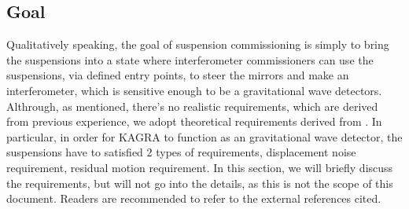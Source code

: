 \subsection{Goal}
Qualitatively speaking, the goal of suspension commissioning is simply to bring the suspensions into a state where interferometer commissioners can use the suspensions, via defined entry points, to steer the mirrors and make an interferometer, which is sensitive enough to be a gravitational wave detectors.
Althrough, as mentioned, there's no realistic requirements, which are derived from previous experience, we adopt theoretical requirements derived from \cite{Sekiguchi:2016bmv}. In particular, in order for KAGRA to function as an gravitational wave detector, the suspensions have to satisfied 2 types of requirements, displacement noise requirement, residual motion requirement.
In this section, we will briefly discuss the requirements, but will not go into the details, as this is not the scope of this document.
Readers are recommended to refer to the external references cited.

